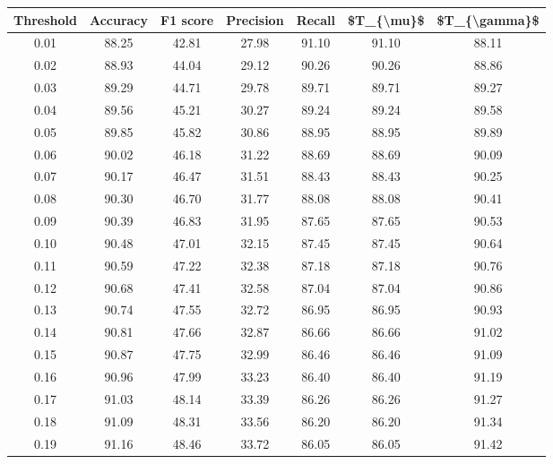 \begin{tabular}{|c|c|c|c|c|c|c|}
\hline
 Threshold &  Accuracy &  F1 score &  Precision &  Recall &  \$T\_\{\textbackslash mu\}\$ &  \$T\_\{\textbackslash gamma\}\$ \\
\hline
      0.01 &     88.25 &     42.81 &      27.98 &   91.10 &      91.10 &         88.11 \\
      0.02 &     88.93 &     44.04 &      29.12 &   90.26 &      90.26 &         88.86 \\
      0.03 &     89.29 &     44.71 &      29.78 &   89.71 &      89.71 &         89.27 \\
      0.04 &     89.56 &     45.21 &      30.27 &   89.24 &      89.24 &         89.58 \\
      0.05 &     89.85 &     45.82 &      30.86 &   88.95 &      88.95 &         89.89 \\
      0.06 &     90.02 &     46.18 &      31.22 &   88.69 &      88.69 &         90.09 \\
      0.07 &     90.17 &     46.47 &      31.51 &   88.43 &      88.43 &         90.25 \\
      0.08 &     90.30 &     46.70 &      31.77 &   88.08 &      88.08 &         90.41 \\
      0.09 &     90.39 &     46.83 &      31.95 &   87.65 &      87.65 &         90.53 \\
      0.10 &     90.48 &     47.01 &      32.15 &   87.45 &      87.45 &         90.64 \\
      0.11 &     90.59 &     47.22 &      32.38 &   87.18 &      87.18 &         90.76 \\
      0.12 &     90.68 &     47.41 &      32.58 &   87.04 &      87.04 &         90.86 \\
      0.13 &     90.74 &     47.55 &      32.72 &   86.95 &      86.95 &         90.93 \\
      0.14 &     90.81 &     47.66 &      32.87 &   86.66 &      86.66 &         91.02 \\
      0.15 &     90.87 &     47.75 &      32.99 &   86.46 &      86.46 &         91.09 \\
      0.16 &     90.96 &     47.99 &      33.23 &   86.40 &      86.40 &         91.19 \\
      0.17 &     91.03 &     48.14 &      33.39 &   86.26 &      86.26 &         91.27 \\
      0.18 &     91.09 &     48.31 &      33.56 &   86.20 &      86.20 &         91.34 \\
      0.19 &     91.16 &     48.46 &      33.72 &   86.05 &      86.05 &         91.42 \\

\end{tabular}
